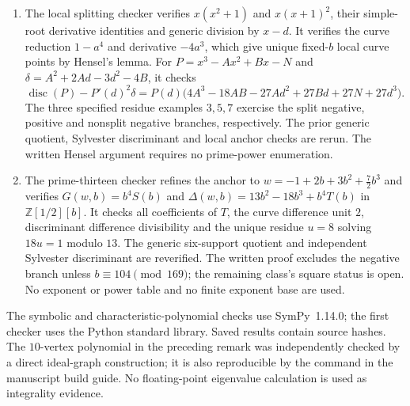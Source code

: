 \begin{enumerate}
modulo-five table. The valuation proof has no finite exponent base.
\item The local splitting checker verifies $x(x^2+1)$ and $x(x+1)^2$,
their simple-root derivative identities and generic division by $x-d$.
It verifies the curve reduction $1-a^4$ and derivative $-4a^3$, which
give unique fixed-$b$ local curve points by Hensel's lemma.
For $P=x^3-Ax^2+Bx-N$ and $\delta=A^2+2Ad-3d^2-4B$, it checks
\[
 \operatorname{disc}(P)-P'(d)^2\delta
 =P(d)\bigl(4A^3-18AB-27Ad^2+27Bd+27N+27d^3\bigr).
\]
The three specified residue examples $3,5,7$ exercise the split negative,
positive and nonsplit negative branches, respectively. The prior generic
quotient, Sylvester discriminant and local anchor checks are rerun.
The written Hensel argument requires no prime-power enumeration.
\item The prime-thirteen checker refines the anchor to
$w=-1+2b+3b^2+\frac72b^3$ and verifies $G(w,b)=b^4S(b)$ and
$\Delta(w,b)=13b^2-18b^3+b^4T(b)$ in $\mathbb Z[1/2][b]$.
It checks all coefficients of $T$, the curve difference unit $2$,
discriminant difference divisibility and the unique residue $u=8$
solving $18u=1$ modulo $13$. The generic six-support quotient and
independent Sylvester discriminant are reverified. The written proof
excludes the negative branch unless $b\equiv104\pmod{169}$;
the remaining class's square status is open. No exponent or power
table and no finite exponent base are used.
\end{enumerate}

The symbolic and characteristic-polynomial checks use SymPy~1.14.0;
the first checker uses the Python standard library.
Saved results contain source hashes. The $10$-vertex polynomial in the
preceding remark was independently checked by a direct ideal-graph
construction; it is also reproducible by the command in the manuscript
build guide. No floating-point eigenvalue calculation is used as
integrality evidence.
